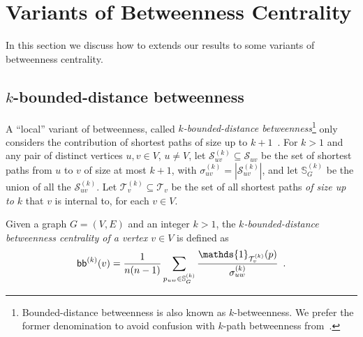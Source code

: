 \ifproof
\section{Variants of Betweenness Centrality}\label{sec:variants}
In this section we discuss how to extends our results to some variants of
betweenness centrality.

\subsection{$k$-bounded-distance betweenness}
A ``local'' variant of betweenness, called \emph{$k$-bounded-distance
betweenness}\footnote{Bounded-distance betweenness is also known as
$k$-betweenness. We prefer the former denomination to avoid confusion with
$k$-path betweenness from~\citep{KourtellisASIT12}.} only considers
the contribution of shortest paths of size up to $k+1$~\citep{BorgattiE06,Brandes08}.
For $k>1$ and any pair of distinct vertices $u,v\in V$, $u\neq V$, let
$\mathcal{S}^{(k)}_{uv}\subseteq\mathcal{S}_{uv}$ be the set of shortest paths
from $u$ to $v$ of size at most $k+1$, with
$\sigma^{(k)}_{uv}=|\mathcal{S}^{(k)}_{uv}|$, and let $\mathbb{S}^{(k)}_G$ be the
union of all the $\mathcal{S}^{(k)}_{uv}$. Let
$\mathcal{T}^{(k)}_v\subseteq\mathcal{T}_v$ be the set of all shortest paths
\emph{of size up to $k$} that $v$ is internal to, for each $v\in V$.

\begin{definition}\label{def:kboundbetweenness}
  \citep{BorgattiE06,Brandes08} Given a graph $G=(V,E)$ and an integer $k>1$,
  the \emph{$k$-bounded-distance betweenness centrality of a vertex $v\in V$} is
  defined as
  \[
  \kboundbetw^{(k)}(v)=\frac{1}{n(n-1)}\sum_{p_{uw}\in\mathbb{S}^{(k)}_G}\frac{\mathds{1}_{\mathcal{T}^{(k)}_v}(p)}{\sigma^{(k)}_{uw}}
  \enspace.
  \]
\end{definition}

